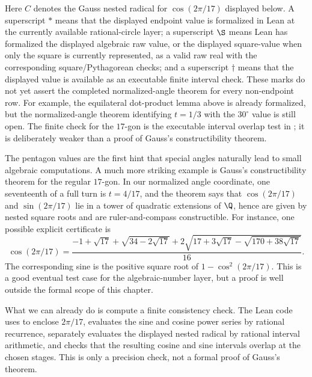 Here \(C\) denotes the Gauss nested radical for \(\cos(2\pi/17)\) displayed
below.  A superscript \(\ast\) means that the displayed endpoint value is
formalized in Lean at the currently available rational-circle layer; a
superscript \(\S\) means Lean has formalized the displayed algebraic raw value,
or the displayed square-value when only the square is currently represented,
as a valid raw real with the corresponding square/Pythagorean checks; and a
superscript \(\dagger\) means that the displayed value is available as an
executable finite interval check.  These marks do not yet assert the completed
normalized-angle theorem for every non-endpoint row.  For example, the
equilateral dot-product lemma above is already formalized, but the
normalized-angle theorem identifying \(t=1/3\) with the \(30^\circ\) value is
still open.  The finite check for the \(17\)-gon is the executable interval
overlap test in ; it is deliberately weaker than a proof
of Gauss's constructibility theorem.

\begin{remark}
\leanok
The pentagon values are the first hint that special angles naturally lead to
small algebraic computations.  A much more striking example is Gauss's
constructibility theorem for the regular \(17\)-gon.  In our normalized angle
coordinate, one seventeenth of a full turn is \(t=4/17\), and the theorem says
that \(\cos(2\pi/17)\) and \(\sin(2\pi/17)\) lie in a tower of quadratic
extensions of \(\Q\), hence are given by nested square roots and are
ruler-and-compass constructible.  For instance, one possible explicit
certificate is
\[
\cos(2\pi/17)=
\frac{-1+\sqrt{17}+\sqrt{34-2\sqrt{17}}
  +2\sqrt{17+3\sqrt{17}-\sqrt{170+38\sqrt{17}}}}{16}.
\]
The corresponding sine is the positive square root of \(1-\cos^2(2\pi/17)\).
This is a good eventual test case for the algebraic-number layer, but a proof
is well outside the formal scope of this chapter.

What we can already do is compute a finite consistency check.  The Lean code
uses  to enclose \(2\pi/17\), evaluates the sine and cosine
power series by rational recurrence, separately evaluates the displayed
nested radical by rational interval arithmetic, and checks that the resulting
cosine and sine intervals overlap at the chosen stages.  This is only a
precision check, not a formal proof of Gauss's theorem.
\end{remark}

